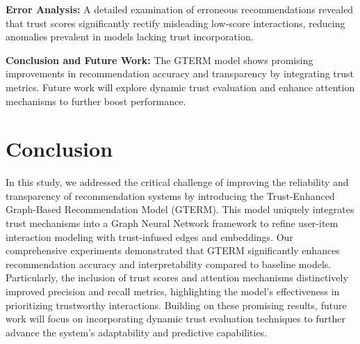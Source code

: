 \documentclass{article} %
\begin{document}
\textbf{Error Analysis:} A detailed examination of erroneous recommendations revealed that trust scores significantly rectify misleading low-score interactions, reducing anomalies prevalent in models lacking trust incorporation.

\textbf{Conclusion and Future Work:} The GTERM model shows promising improvements in recommendation accuracy and transparency by integrating trust metrics. Future work will explore dynamic trust evaluation and enhance attention mechanisms to further boost performance.


\section{Conclusion}

In this study, we addressed the critical challenge of improving the reliability and transparency of recommendation systems by introducing the Trust-Enhanced Graph-Based Recommendation Model (GTERM). This model uniquely integrates trust mechanisms into a Graph Neural Network framework to refine user-item interaction modeling with trust-infused edges and embeddings. Our comprehensive experiments demonstrated that GTERM significantly enhances recommendation accuracy and interpretability compared to baseline models. Particularly, the inclusion of trust scores and attention mechanisms distinctively improved precision and recall metrics, highlighting the model's effectiveness in prioritizing trustworthy interactions. Building on these promising results, future work will focus on incorporating dynamic trust evaluation techniques to further advance the system's adaptability and predictive capabilities.



\end{document}
